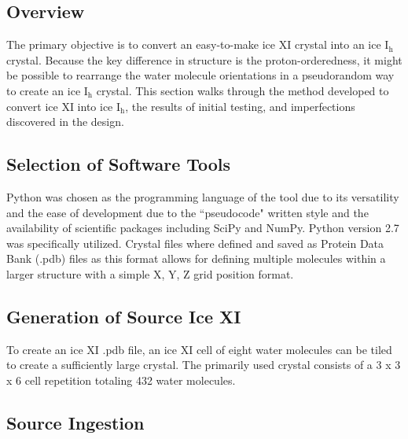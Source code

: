 
\subsection{Overview}

The primary objective is to convert an easy-to-make ice XI crystal into an ice I$_{\mathrm{h}}$ crystal.
Because the key difference in structure is the proton-orderedness, it might be possible to rearrange the water molecule orientations in a pseudorandom way to create an ice I$_{\mathrm{h}}$ crystal.
This section walks through the method developed to convert ice XI into ice I$_{\mathrm{h}}$, the results of initial testing, and imperfections discovered in the design.

\subsection{Selection of Software Tools}

Python was chosen as the programming language of the tool due to its versatility and the ease of development due to the ``pseudocode" written style and the availability of scientific packages including SciPy and NumPy. 
Python version 2.7 was specifically utilized.
Crystal files where defined and saved as Protein Data Bank (.pdb) files as this format allows for defining multiple molecules within a larger structure with a simple X, Y, Z grid position format. 

\subsection{Generation of Source Ice XI}

To create an ice XI .pdb file, an ice XI cell of eight water molecules can be tiled to create a sufficiently large crystal.
The primarily used crystal consists of a 3 x 3 x 6 cell repetition totaling 432 water molecules.

\subsection{Source Ingestion}

